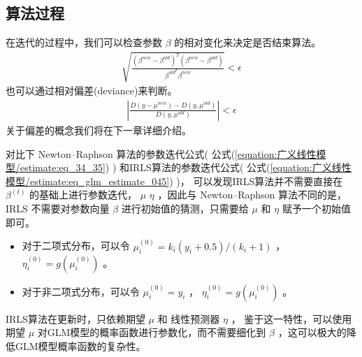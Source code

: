 \documentclass[letterpaper,10pt,english]{sphinxmanual}
\begin{document}
\subsection{算法过程}
\label{\detokenize{_u5e7f_u4e49_u7ebf_u6027_u6a21_u578b/estimate:id11}}

在迭代的过程中，我们可以检查参数 \(\beta\) 的相对变化来决定是否结束算法。
\begin{equation}\label{equation:广义线性模型/estimate:广义线性模型/estimate:43}
\begin{split}\sqrt{\frac{ (\beta^{new}-\beta^{old})^T (\beta^{new}-\beta^{old})  }{ \beta^{old^T} \beta^{new} } } < \epsilon\end{split}
\end{equation}
也可以通过相对偏差(deviance)来判断。
\begin{equation}\label{equation:广义线性模型/estimate:广义线性模型/estimate:44}
\begin{split}\left|\frac{D(y-\mu^{new})-D(y,\mu^{old})   }{D(y,\mu^{old})} \right| <\epsilon\end{split}
\end{equation}
关于偏差的概念我们将在下一章详细介绍。


对比下 Newton–Raphson 算法的参数迭代公式( 公式(\ref{equation:广义线性模型/estimate:eq_34_35}) )
和IRLS算法的参数迭代公式( 公式(\ref{equation:广义线性模型/estimate:eq_glm_estimate_045}) )，
可以发现IRLS算法并不需要直接在 \(\beta^{(t)}\) 的基础上进行参数迭代，
 \(\mu\)  \(\eta\)
，因此与 Newton–Raphson 算法不同的是，IRLS 不需要对参数向量 \(\beta\)
进行初始值的猜测，只需要给 \(\mu\) 和 \(\eta\) 赋予一个初始值即可。
\begin{itemize}
\item {} 
对于二项式分布，可以令 \(\mu_i^{(0)}=k_i(y_i+0.5)/(k_i+1)\)
，\(\eta_i^{(0)}=g(\mu_i^{(0)})\) 。

\item {} 
对于非二项式分布，可以令 \(\mu_i^{(0)}=y_i\)
， \(\eta_i^{(0)}=g(\mu_i^{(0)})\) 。

\end{itemize}

IRLS算法在更新时，只依赖期望 \(\mu\) 和 线性预测器 \(\eta\) ，
鉴于这一特性，可以使用期望 \(\mu\) 对GLM模型的概率函数进行参数化，而不需要细化到 \(\beta\)
，这可以极大的降低GLM模型概率函数的复杂性。

\end{document}
